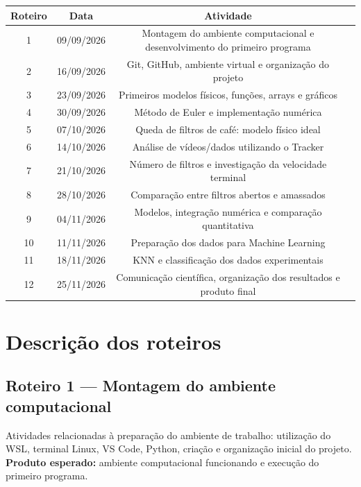 \documentclass[11pt,a4paper]{article}
\begin{document}
\vspace{0.5em}
\begin{center}
\small
{}
\begin{tabularx}{\textwidth}{c c c X}
\hline
\rowcolor{primary} \color{white}\textbf{Roteiro} & \color{white}\textbf{Data} & \color{white}\textbf{Atividade} \\
\hline
1 & 09/09/2026   & Montagem do ambiente computacional e desenvolvimento do primeiro programa \\
2 & 16/09/2026   & Git, GitHub, ambiente virtual e organização do projeto \\
3 & 23/09/2026   & Primeiros modelos físicos, funções, arrays e gráficos \\
4 & 30/09/2026   & Método de Euler e implementação numérica \\
5 & 07/10/2026   & Queda de filtros de café: modelo físico ideal \\
6 & 14/10/2026   & Análise de vídeos/dados utilizando o Tracker \\
7 & 21/10/2026   & Número de filtros e investigação da velocidade terminal \\
8 & 28/10/2026   & Comparação entre filtros abertos e amassados \\
9 & 04/11/2026   & Modelos, integração numérica e comparação quantitativa \\
10 & 11/11/2026  & Preparação dos dados para Machine Learning \\
11 & 18/11/2026  & KNN e classificação dos dados experimentais \\
12 & 25/11/2026  & Comunicação científica, organização dos resultados e produto final \\
\hline
\end{tabularx}
\end{center}
\vspace{0.5em}

\section{Descrição dos roteiros}

\subsection*{Roteiro 1 --- Montagem do ambiente computacional}
Atividades relacionadas à preparação do ambiente de trabalho: utilização do WSL, terminal Linux, VS Code, Python, criação e organização inicial do projeto.\\
\textbf{Produto esperado:} ambiente computacional funcionando e execução do primeiro programa.
\end{document}

